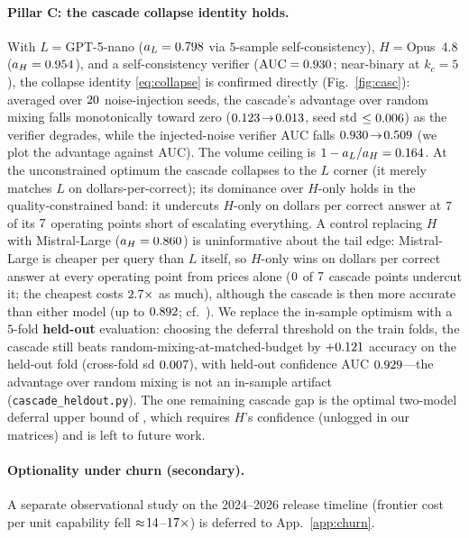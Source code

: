 \documentclass[11pt]{article}
\theoremstyle{plain}
\theoremstyle{definition}
\begin{document}
\paragraph{Pillar C: the cascade collapse identity holds.} With $L=$GPT-5-nano ($a_L=0.798$ via $5$-sample self-consistency), $H=$Opus~4.8
($a_H=0.954$), and a self-consistency verifier ($\mathrm{AUC}=0.930$; near-binary at $k_c{=}5$), the collapse identity
\eqref{eq:collapse} is confirmed directly (Fig.~\ref{fig:casc}): averaged over $20$ noise-injection seeds, the cascade's
advantage over random mixing falls monotonically toward zero ($0.123\!\to\!0.013$, seed std $\le0.006$) as the verifier
degrades, while the injected-noise verifier AUC falls $0.930\!\to\!0.509$ (we plot the advantage against AUC). The volume ceiling is $1-a_L/a_H=0.164$. At the unconstrained optimum the cascade collapses to the
$L$ corner (it merely matches $L$ on dollars-per-correct); its dominance over $H$-only holds in the quality-constrained band: it
undercuts $H$-only on dollars per correct answer at $7$ of its $7$ operating points short of escalating
everything. A control replacing $H$ with Mistral-Large ($a_H=0.860$) is uninformative about the tail edge: Mistral-Large is cheaper
per query than $L$ itself, so $H$-only wins on dollars per correct answer at every operating point from prices alone
($0$ of $7$ cascade points undercut it; the cheapest costs $2.7\times$ as much), although the cascade
is then more accurate than either model (up to $0.892$; cf.\ \citealp{jitkrittum2023cascade}). We replace the
in-sample optimism with a $5$-fold \textbf{held-out} evaluation: choosing the deferral threshold on the train folds, the cascade
still beats random-mixing-at-matched-budget by $+0.121$ accuracy on the held-out fold (cross-fold sd $0.007$), with held-out
confidence AUC $0.929$---the advantage over random mixing is not an in-sample artifact (\texttt{cascade\_heldout.py}). The one remaining cascade gap
is the optimal two-model deferral upper bound of \citet{jitkrittum2023cascade}, which requires $H$'s confidence (unlogged in our
matrices) and is left to future work.

\paragraph{Optionality under churn (secondary).} A separate observational study on the 2024--2026 release timeline (frontier
cost per unit capability fell $\approx\!14$--$17\times$) is deferred to
App.~\ref{app:churn}.
\end{document}
